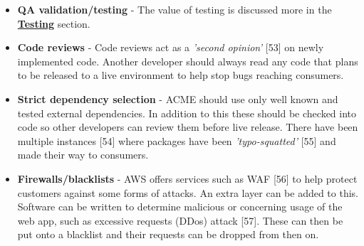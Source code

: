 \begin{itemize}
    \item \textbf{QA validation/testing} - The value of testing is discussed more in the \hyperref[sec:Testing]{\textbf{Testing}} section.
    
    \item \textbf{Code reviews} - Code reviews act as a \textit{'second opinion'} [53] on newly implemented code. Another developer should always read any 
    code that plans to be released to a live environment to help stop bugs reaching consumers.

    \item \textbf{Strict dependency selection} - ACME should use only well known and tested external dependencies. In addition to this these should be checked
    into code so other developers can review them before live release. There have been multiple instances [54] where packages have been 
    \textit{'typo-squatted'} [55] and made their way to consumers.
    
    \item \textbf{Firewalls/blacklists} - AWS offers services such as WAF [56] to help protect customers against some forms of attacks. An extra layer can be 
    added to this. Software can be written to determine malicious or concerning usage of the web app, such as excessive requests (DDos) attack [57]. 
    These can then be put onto a blacklist and their requests can be dropped from then on.
  \end{itemize}

\newpage
